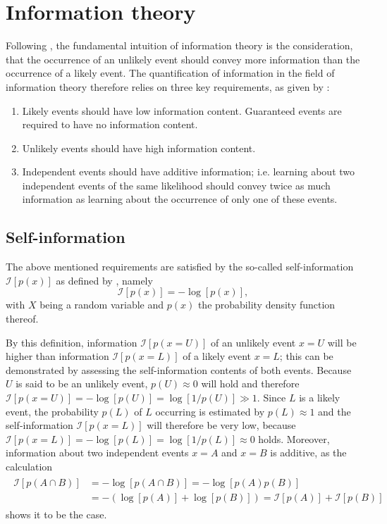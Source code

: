 \documentclass[a4paper,11pt]{report}
\begin{document}
\section{Information theory}
Following \cite[p.73]{Goodfellow.2016}, the fundamental intuition of information theory is the consideration, that the occurrence of an unlikely event should convey more information than the occurrence of a likely event. The quantification of information in the field of information theory therefore relies on three key requirements, as given by \cite[p.73]{Goodfellow.2016}:
\begin{enumerate}
\item Likely events should have low information content. Guaranteed events are required to have no information content.
\item Unlikely events should have high information content.
\item Independent events should have additive information; i.e. learning about two independent events of the same likelihood should convey twice as much information as learning about the occurrence of only one of these events.
\end{enumerate} %

\subsection{Self-information}
The above mentioned requirements are satisfied by the so-called self-information $\mathcal{I}[p(x)]$ as defined by \cite[p.73]{Goodfellow.2016}, namely \begin{equation}\label{eq:defselfinformation}
\mathcal{I}[p(x)] = -\log\left[p(x)\right],
\end{equation} with $X$ being a random variable and $p(x)$ the probability density function thereof.

By this definition, information $\mathcal{I}[p(x=U)]$ of an unlikely event $x=U$ will be higher than information $\mathcal{I}[p(x=L)]$ of a likely event $x = L$; this can be demonstrated by assessing the self-information contents of both events. Because $U$ is said to be an unlikely event, $p(U) \approx 0$ will hold and therefore $\mathcal{I}[p(x=U)] = -\log[p(U)] = \log[1/p(U)] \gg 1$. Since $L$ is a likely event, the probability $p(L)$ of $L$ occurring is estimated by $p(L) \approx 1$ and the self-information $\mathcal{I}[p(x=L)]$ will therefore be very low, because $\mathcal{I}[p(x=L)] = -\log[p(L)] = \log[1/p(L)] \approx 0$ holds. Moreover, information about two independent events $x=A$ and $x=B$ is additive, as the calculation
\begin{align}
\begin{aligned} \mathcal{I}[p(A\cap B)] &= -\log[p(A\cap B)] = -\log[p(A)p(B)] \\ &= -(\log[p(A)] + \log[p(B)]) = \mathcal{I}[p(A)] + \mathcal{I}[p(B)]
\end{aligned}
\end{align} shows it to be the case.
\end{document}
